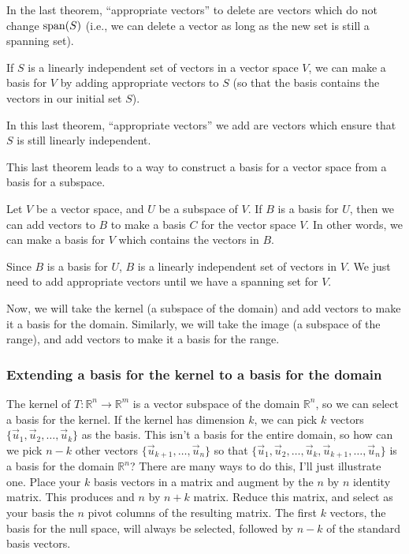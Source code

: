 In the last theorem, ``appropriate vectors'' to delete are vectors which do not change $\operatorname{span}(S)$ (i.e., we can delete a vector as long as the new set is still a spanning set).


\begin{theorem}
  If $S$ is a linearly independent set of vectors in a vector space $V$, we can make a basis for $V$ by adding appropriate vectors to $S$ (so that the basis contains the vectors in our initial set $S$).
\end{theorem}

In this last theorem, ``appropriate vectors'' we add are vectors which ensure that $S$ is still linearly independent.

This last theorem leads to a way to construct a basis for a vector space from a basis for a subspace.

\begin{theorem}
  Let $V$ be a vector space, and $U$ be a subspace of $V$.  If $B$ is a basis for $U$, then we can add vectors to $B$ to make a basis $C$ for the vector space $V$.  In other words, we can make a basis for $V$ which contains the vectors in $B$.
\end{theorem}

Since $B$ is a basis for $U$, $B$ is a linearly independent set of vectors in $V$.  We just need to add appropriate vectors until we have a spanning set for $V$.

Now, we will take the kernel (a subspace of the domain) and add vectors to make it a basis for the domain.  Similarly, we will take the image (a subspace of the range), and add vectors to make it a basis for the range.

\subsubsection{Extending a basis for the kernel to a basis for the domain}
The kernel of $T\colon{\mathbb{R}}^n\to{\mathbb{R}}^m$ is a vector subspace of the domain ${\mathbb{R}}^n$, so we can select a basis for the kernel. 
If the kernel has dimension $k$, we can pick $k$ vectors $\{\vec u_1, \vec u_2,\ldots, \vec u_k\}$ as the basis. 
This isn't a basis for the entire domain, so how can we pick $n-k$ other vectors $\{\vec u_{k+1},\ldots, \vec u_n\}$ so that $\{\vec u_1, \vec u_2,\ldots, \vec u_k,\vec u_{k+1},\ldots, \vec u_n\}$ is a basis for the domain ${\mathbb{R}}^n$? 
There are many ways to do this, I'll just illustrate one.  
Place your $k$ basis vectors in a matrix and augment by the $n$ by $n$ identity matrix.  This produces and $n$ by $n+k$ matrix.  Reduce this matrix, and select as your basis the $n$ pivot columns of the resulting matrix. The first $k$ vectors, the basis for the null space, will always be selected, followed by $n-k$ of the standard basis vectors.

